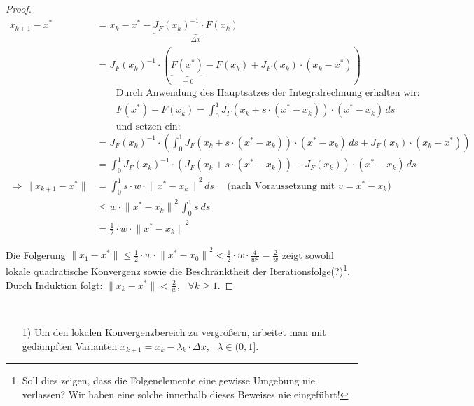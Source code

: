 \begin{proof}
\begin{align*}
x_{k+1}-x^*
  &= x_k-x^*-\underset{\Delta x}{\underbrace{{J_F(x_k)}^{-1}\cdot F(x_k)}}\\
  &= {J_F(x_k)}^{-1}\cdot (\underset{=0}{\underbrace{F(x^*)}}-F(x_k)+J_F(x_k)\cdot (x_k-x^*))\\
  &\qquad\text{Durch Anwendung des Hauptsatzes der Integralrechnung erhalten wir: } \\
  &\qquad F(x^*)-F(x_k) = \int_{0}^1 J_F(x_k+s\cdot (x^*-x_k))\cdot (x^*-x_k)\,ds\\
  &\qquad \text{und setzen ein:} \\
%
  &= {J_F(x_k)}^{-1}\cdot ( \int_{0}^1 J_F(x_k+s\cdot (x^*-x_k))\cdot (x^*-x_k)\,ds +J_F(x_k)\cdot (x_k-x^*))\\
%
  &= \int_{0}^1 {J_F(x_k)}^{-1}\cdot (J_F(x_k+s\cdot(x^*-x_k))-J_F(x_k))\cdot (x^*-x_k)\,ds\\
\Rightarrow \| x_{k+1}-x^*\|
  & = \int_{0}^1 s\cdot  w \cdot {\| x^*-x_k\|}^2\,ds \quad\text{ \ (nach Voraussetzung mit $v=x^*-x_k$)}\\
  &\leq w \cdot {\| x^*-x_k\|}^2\,\int_0^1s~ds \\
&=\frac{1}{2}\cdot  w \cdot {\| x^*-x_k\|}^2
\end{align*}

\noindent Die Folgerung $\|x_1-x^*\|\leq \frac{1}{2}\cdot  w \cdot {\| x^*-x_0\|}^2<\frac{1}{2}\cdot  w
\cdot \frac{4}{{ w}^2}=\frac{2}{ w}$ zeigt sowohl lokale quadratische
Konvergenz sowie die Beschränktheit der Iterationsfolge(?)\footnote{Soll dies
zeigen, dass die Folgenelemente eine gewisse Umgebung nie verlassen? Wir haben
eine solche innerhalb dieses Beweises nie eingeführt!}.
Durch Induktion folgt: $\|x_k-x^*\|<\frac{2}{ w}$, \ $\forall k \geq 1$.
\end{proof}

\begin{bemerkung}
~
\begin{enumerate}
\item[1)] Um den lokalen Konvergenzbereich zu vergrößern, arbeitet man mit gedämpften Varianten $x_{k+1}=x_k-\lambda_k\cdot \Delta x$, \ $\lambda\in (0,1]$.
\end{enumerate}

\end{bemerkung}
